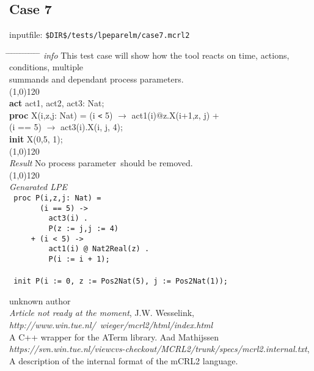\documentclass[a4paper,10pt]{article}
\theoremstyle{plain}
\theoremstyle{definition}
\newcommand{\ti}{\textit}
\newcommand{\tb}{\textbf}
\newcommand{\pp}{process parameter}
\newcommand{\pps}{process parameters}
\newcommand{\tabw}{\hspace*{15.mm} \= \hspace*{20.mm} \= \hspace*{5.mm} \= \hspace*{5.mm} \= \hspace*{5.mm} \= \hspace*{5.mm}  \= \hspace*{5.mm}  \= \hspace*{5.mm}  \= \hspace*{5.mm} \= \hspace*{5.mm} \= \hspace*{5.mm}  \= \hspace*{5.mm}  \= \hspace*{5.mm}\kill}
\begin{document}
\subsection*{Case 7}
inputfile: \verb"$DIR$/tests/lpeparelm/case7.mcrl2"
\begin{tabbing}
\tabw
\ti{info} \> This test case will show how the tool reacts on time, actions, conditions, multiple \\
	\> summands and dependant \pps.\\
\line(1,0){120}\\
\tb{act}  \> act1, act2, act3: Nat;\\
\tb{proc} \> X(i,z,j: Nat) \>    = \>  (i \verb"<"  5) $\rightarrow$ act1(i)$@$z.X(i+1,z, j) +\\
          \>               \>  \> (i == 5) $\rightarrow$ act3(i).X(i, j, 4); \\
\tb{init} X(0,5, 1);\\
\line(1,0){120}\\
\ti{Result} \> No \pp\ should be removed.\\ 
\line(1,0){120}\\
\ti{Genarated LPE} \\
\>  \verb" proc P(i,z,j: Nat) ="\\
\>  \verb"       (i == 5) ->"\\
\>  \verb"         act3(i) ."\\
\>  \verb"         P(z := j,j := 4)"\\
\>  \verb"     + (i < 5) ->"\\
\>  \verb"         act1(i) @ Nat2Real(z) ."\\
\>  \verb"         P(i := i + 1);"\\
\\
\>  \verb" init P(i := 0, z := Pos2Nat(5), j := Pos2Nat(1));"\\
\end{tabbing}

\begin{thebibliography}{99}  
    unknown author \\
   \textit{Article not ready at the moment},
   J.W. Wesselink,
   \textit{http://www.win.tue.nl/~wieger/mcrl2/html/index.html}\\
   A C++ wrapper for the ATerm library.
    Aad Mathijssen\\
   \textit{https://svn.win.tue.nl/viewcvs-checkout/MCRL2/trunk/specs/mcrl2.internal.txt},
   A description of the internal format of the mCRL2 language.



\end{thebibliography}
\end{document}

